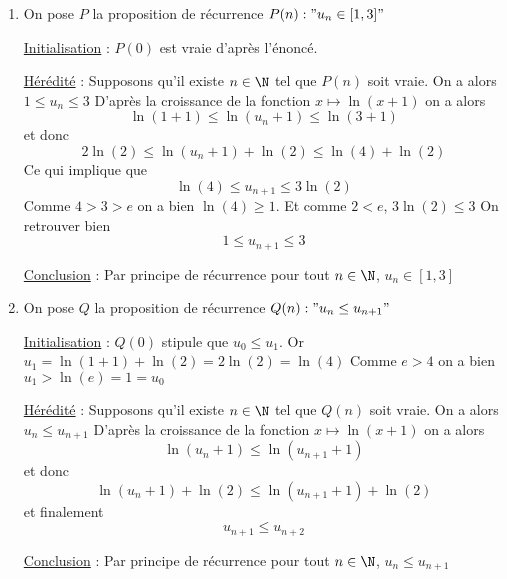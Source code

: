 \documentclass[a4paper, 11pt,reqno]{article}
\begin{document}
\begin{correction}
\begin{enumerate}
\item On pose $P$ la proposition de récurrence  $P(n) : " u_n \in [1,3]"$

\underline{Initialisation} : 
$P(0)$ est vraie d'après l'énoncé. 

\underline{Hérédité} : 
Supposons qu'il existe $n\in \N$ tel que $P(n)$ soit vraie. On a alors $1\leq u_n\leq 3$
D'après la croissance de la fonction $x\mapsto \ln(x+1)$ on a alors 
$$\ln(1+1 )\leq \ln(u_n+1) \leq \ln( 3+1)$$
et donc 
$$2\ln(2)\leq \ln(u_n+1) +\ln(2) \leq \ln( 4)+\ln(2) $$
Ce qui implique que 
$$\ln(4)\leq u_{n+1}\leq3\ln( 2)$$
Comme $4>3>e$ on a bien $\ln(4)\geq 1$. Et comme  $2<e$, $3\ln(2) \leq 3$
On retrouver bien 
$$1\leq u_{n+1} \leq 3$$

\underline{Conclusion} : 
Par principe de récurrence pour tout $n\in \N$, $u_n\in [1,3]$

\item 
On pose $Q$ la proposition de récurrence  $Q(n) : " u_n\leq u_{n+1}"$

\underline{Initialisation} : 
$Q(0)$ stipule que  $u_0\leq u_1$. Or $u_1= \ln(1+1)+\ln(2)= 2\ln(2)=\ln(4)$
Comme $e>4$ on a bien $u_1 > \ln(e) =1=u_0$

\underline{Hérédité} : 
Supposons qu'il existe $n\in \N$ tel que $Q(n)$ soit vraie. On a alors $u_n\leq u_{n+1}$
D'après la croissance de la fonction $x\mapsto \ln(x+1)$ on a alors 
$$\ln(u_n+1 )\leq \ln(u_{n+1}+1) $$
et donc 
$$\ln(u_n+1 )+\ln(2)\leq \ln(u_{n+1}+1) +\ln(2)$$
et finalement 
$$u_{n+1} \leq u_{n+2}$$


\underline{Conclusion} : 
Par principe de récurrence pour tout $n\in \N$, $u_{n} \leq u_{n+1}$

\end{enumerate}
\end{correction}


\vspace{0.5cm}
\end{document}
